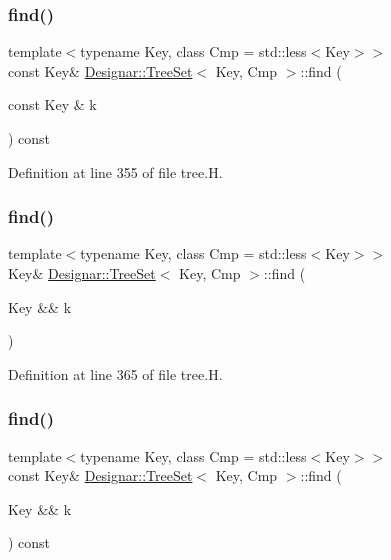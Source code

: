 \subsubsection{\texorpdfstring{find()}{find()}\hspace{0.1cm}{\footnotesize\ttfamily [2/4]}}
{\footnotesize\ttfamily template$<$typename Key, class Cmp = std\+::less$<$\+Key$>$$>$ \\
const Key\& \hyperlink{class_designar_1_1_tree_set}{Designar\+::\+Tree\+Set}$<$ Key, Cmp $>$\+::find (\begin{DoxyParamCaption}\item[{const Key \&}]{k }\end{DoxyParamCaption}) const\hspace{0.3cm}{\ttfamily [inline]}}



Definition at line 355 of file tree.\+H.

\mbox{\label{class_designar_1_1_tree_set_a40ba1bcb8ca94157e3890b3e81be4794}} 
\subsubsection{\texorpdfstring{find()}{find()}\hspace{0.1cm}{\footnotesize\ttfamily [3/4]}}
{\footnotesize\ttfamily template$<$typename Key, class Cmp = std\+::less$<$\+Key$>$$>$ \\
Key\& \hyperlink{class_designar_1_1_tree_set}{Designar\+::\+Tree\+Set}$<$ Key, Cmp $>$\+::find (\begin{DoxyParamCaption}\item[{Key \&\&}]{k }\end{DoxyParamCaption})\hspace{0.3cm}{\ttfamily [inline]}}



Definition at line 365 of file tree.\+H.

\mbox{\label{class_designar_1_1_tree_set_ad07353fe7781a5fe321f3f8b84fc23c7}} 
\subsubsection{\texorpdfstring{find()}{find()}\hspace{0.1cm}{\footnotesize\ttfamily [4/4]}}
{\footnotesize\ttfamily template$<$typename Key, class Cmp = std\+::less$<$\+Key$>$$>$ \\
const Key\& \hyperlink{class_designar_1_1_tree_set}{Designar\+::\+Tree\+Set}$<$ Key, Cmp $>$\+::find (\begin{DoxyParamCaption}\item[{Key \&\&}]{k }\end{DoxyParamCaption}) const\hspace{0.3cm}{\ttfamily [inline]}}



